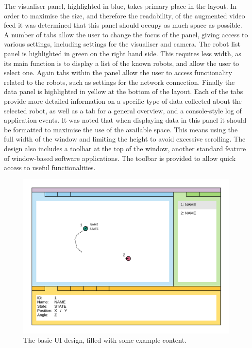 The visualiser panel, highlighted in blue, takes primary place in the layout. In order to maximise the size, and therefore the readability, of the augmented video feed it was determined that this panel should occupy as much space as possible. A number of tabs allow the user to change the focus of the panel, giving access to various settings, including settings for the visualiser and camera. The robot list panel is highlighted in green on the right hand side. This requires less width, as its main function is to display a list of the known robots, and allow the user to select one. Again tabs within the panel allow the user to access functionality related to the robots, such as settings for the network connection. Finally the data panel is highlighted in yellow at the bottom of the layout. Each of the tabs provide more detailed information on a specific type of data collected about the selected robot, as well as a tab for a general overview, and a console-style log of application events. It was noted that when displaying data in this panel it should be formatted to maximise the use of the available space. This means using the full width of the window and limiting the height to avoid excessive scrolling. The design also includes a toolbar at the top of the window, another standard feature of window-based software applications. The toolbar is provided to allow quick access to useful functionalities.

\begin{figure}[h]
	\centering
	\includegraphics[scale=1]{Figures/UIExample.png}
	\decoRule
	\caption[UI Example]{The basic UI design, filled with some example content.}
	\label{fig:UIExample}
\end{figure}

